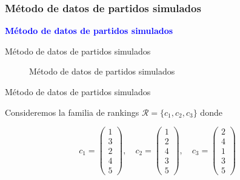 \documentclass[10pt]{beamer}
\begin{document}
	\subsubsection{Método de datos de partidos simulados}
	
	\begin{frame}
		\begin{center}
			\Huge\textbf{\textsf{\textcolor{blue}{Método de datos de partidos simulados}}}
		\end{center}
	\end{frame}
	
	\begin{frame}{Método de datos de partidos simulados}
		\begin{figure}
			\centering
			\resizebox{.6\linewidth}{!}{\partidossimulados}
			\caption{Método de datos de partidos simulados}
			\label{fig:partidos_simulados}
		\end{figure}
	\end{frame}
	
	\begin{frame}{Método de datos de partidos simulados}
		\begin{ejemplo}
			Consideremos la familia de rankings $\mathcal{R} = \{c_1, c_2, c_3\}$ donde
			
			\begin{equation*}
			c_1 = \left( \begin{array}{c}
			1\\
			3\\
			2\\
			4\\
			5
			\end{array} \right), \quad
			c_2 = \left( \begin{array}{c}
			1\\
			2\\
			4\\
			3\\
			5
			\end{array} \right), \quad
			c_3 = \left( \begin{array}{c}
			2\\
			4\\
			1\\
			3\\
			5
			\end{array} \right)
			\end{equation*}
			
		\end{ejemplo}
	\end{frame}
	
\end{document}
